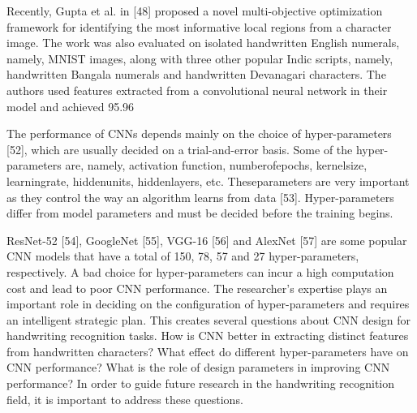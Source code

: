 \vspace{5mm}
Recently, Gupta et al. in [48] proposed a novel multi-objective optimization framework for identifying the
most informative local regions from a character image. The work was also evaluated on isolated handwritten
English numerals, namely, MNIST images, along with three other popular Indic scripts, namely, handwritten
Bangala numerals and handwritten Devanagari characters. The authors used features extracted from a
convolutional neural network in their model and achieved 95.96%
\par 
\vspace{5mm}
The performance of CNNs depends mainly on the choice of hyper-parameters [52], which are usually
decided on a trial-and-error basis. Some of the hyper-parameters are, namely, activation function, numberofepochs, kernelsize, learningrate, hiddenunits, hiddenlayers, etc. Theseparameters are very important
as they control the way an algorithm learns from data [53]. Hyper-parameters differ from model parameters and must be decided before the training begins.
\par
\vspace{5mm}
ResNet-52 [54], GoogleNet [55], VGG-16 [56] and AlexNet [57] are some popular CNN models that have
a total of 150, 78, 57 and 27 hyper-parameters, respectively. A bad choice for hyper-parameters can incur a high computation cost and lead to poor CNN performance. The researcher’s expertise plays an important role in deciding on the configuration of hyper-parameters and requires an intelligent strategic plan. This creates several questions about CNN design for handwriting recognition tasks. How is CNN better in extracting distinct features from handwritten characters? What effect do different hyper-parameters have on CNN performance? What is the role of design parameters in improving CNN performance? In order to guide future research in the handwriting recognition field, it is important to address these questions.